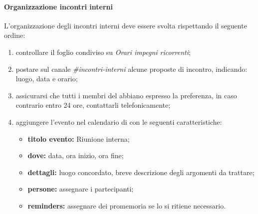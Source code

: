 	        \paragraph{Organizzazione incontri interni}
	        \label{sec:incontri_interni}
	        L'organizzazione degli incontri interni deve essere svolta rispettando il seguente ordine:
	        \begin{enumerate}
	        	\item controllare il foglio condiviso su  \textit{Orari impegni ricorrenti};
	        	\item postare sul canale  \textit{\#incontri-interni} alcune proposte di incontro, indicando: luogo, data e orario;
	        	\item assicurarsi che tutti i membri del  abbiano espresso la preferenza, in caso contrario entro 24 ore, contattarli telefonicamente;
	        	\item aggiungere l'evento nel calendario di  con le seguenti caratteristiche:
	        	\begin{itemize}
	        		\item \textbf{titolo evento:} Riunione interna;
	        		\item \textbf{dove:} data, ora inizio, ora fine;
	        		\item \textbf{dettagli:} luogo concordato, breve descrizione degli argomenti da trattare;
	        		\item \textbf{persone:} assegnare i partecipanti;
	        		\item \textbf{reminders:} assegnare dei promemoria se lo si ritiene necessario.
	        	\end{itemize}
	        \end{enumerate}
